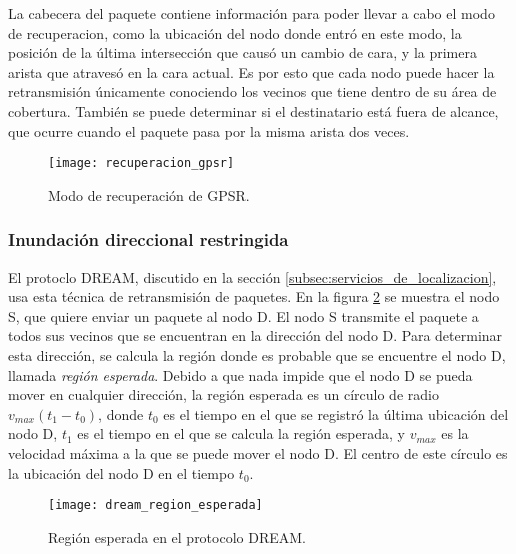 La cabecera del paquete contiene información para poder llevar a cabo el modo de
recuperacion, como la ubicación del nodo donde entró en este modo, la posición
de la última intersección que causó un cambio de cara, y la primera arista que
atravesó en la cara actual. Es por esto que cada nodo puede hacer la
retransmisión únicamente conociendo los vecinos que tiene dentro de su área de
cobertura. También se puede determinar si el destinatario está fuera de alcance,
que ocurre cuando el paquete pasa por la misma arista dos veces.

\begin{figure}[th]
\centering
\texttt{[image: recuperacion\_gpsr]}
\decoRule
\caption[Modo de recuperación de GPSR]{Modo de recuperación de
GPSR\protect\footnotemark.}
\label{fig:recuperacion_gpsr}
\end{figure}


\subsubsection{Inundación direccional restringida}

\label{subsubsec:inundacion_direccional_restringida}

El protoclo DREAM, discutido en la sección
\ref{subsec:servicios_de_localizacion}, usa esta técnica de retransmisión de
paquetes. En la figura \ref{fig:dream_region_esperada} se muestra el nodo S,
que quiere enviar un paquete al nodo D. El nodo S transmite el paquete a todos
sus vecinos que se encuentran en la dirección del nodo D. Para determinar esta
dirección, se calcula la región donde es probable que se encuentre el nodo D,
llamada \textit{región esperada}. Debido a que nada impide que el nodo D se
pueda mover en cualquier dirección, la región esperada es un círculo de radio
$v_{max}(t_1-t_0)$, donde $t_0$ es el tiempo en el que se registró la última
ubicación del nodo D, $t_1$ es el tiempo en el que se calcula la región
esperada, y $v_{max}$ es la velocidad máxima a la que se puede mover el nodo D.
El centro de este círculo es la ubicación del nodo D en el tiempo $t_0$.

\begin{figure}[th]
\centering
\texttt{[image: dream\_region\_esperada]}
\decoRule
\caption[Región esperada en el protocolo DREAM]{Región esperada en el protocolo
DREAM\protect\footnotemark.}
\label{fig:dream_region_esperada}
\end{figure}


